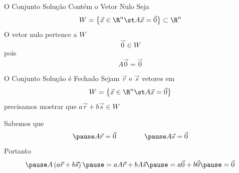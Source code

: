 \documentclass[fleqn,aspectratio=169,12pt]{beamer}
\begin{document}
\begin{proofframe}{O Conjunto Solução Contém o Vetor Nulo}
  Seja
  \[
    W = \left\{ \vec{x}\in\R^n \st A\vec{x} = \vec{0} \right\}
    \subset \R^n
  \]
  \pause
  O vetor nulo pertence a $W$
  \[
    \vec{0} \in W
  \]
  \pause
  pois
  \[
    A \vec{0} = \vec{0}
  \]
\end{proofframe}

\begin{proofframe}{O Conjunto Solução é Fechado}
  Sejam \(\vec{r}\) e \(\vec{s}\) vetores em
  \[
    W = \left\{ \vec{x}\in\R^n \st A\vec{x} = \vec{0} \right\}
  \]
  \pause
  precisamos mostrar que \(a\vec{r} + b\vec{s} \in W\)

  \pause
  Sabemos que
  \[
    \pause
    A \vec{r} = \vec{0}
    \qquad\qquad
    \pause
    A \vec{s} = \vec{0}
  \]
  \pause
  Portanto
  \[
    \pause
    A\left(a\vec{r} + b\vec{s}\right)
    \pause
    = aA\vec{r} + bA\vec{s}
    \pause
    = a\vec{0} + b\vec{0}
    \pause
    = \vec{0}
  \]
\end{proofframe}





%


%
%

%
%

\end{document}

